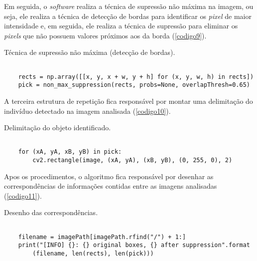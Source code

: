 Em seguida, o \textit{software} realiza a técnica de supressão não máxima na imagem, ou seja, ele realiza a técnica de detecção de bordas para identificar os \textit{pixel} de maior intensidade e, em seguida, ele realiza a técnica de supressão para eliminar os \textit{pixels} que não possuem valores próximos aos da borda (\autoref{codigo9}).

\begin{listing}[ht]
\caption{\label{codigo9}Técnica de supressão não máxima (detecção de bordas).}
\begin{verbatim}

    rects = np.array([[x, y, x + w, y + h] for (x, y, w, h) in rects])
	pick = non_max_suppression(rects, probs=None, overlapThresh=0.65)

\end{verbatim}
\end{listing}

A terceira estrutura de repetição fica responsável por montar uma delimitação do indivíduo detectado na imagem analisada (\autoref{codigo10}).


\begin{listing}[ht]
\caption{\label{codigo10}Delimitação do objeto identificado.}
\begin{verbatim}

    for (xA, yA, xB, yB) in pick:
		cv2.rectangle(image, (xA, yA), (xB, yB), (0, 255, 0), 2)

\end{verbatim}
\end{listing}

Apos os procedimentos, o algoritmo fica responsável por desenhar as correspondências de informações contidas entre as imagens analisadas (\autoref{codigo11}).

\begin{listing}[ht]
\caption{\label{codigo11}Desenho das correspondências.}
\begin{verbatim}

    filename = imagePath[imagePath.rfind("/") + 1:]
	print("[INFO] {}: {} original boxes, {} after suppression".format
		(filename, len(rects), len(pick)))

\end{verbatim}
\end{listing}

